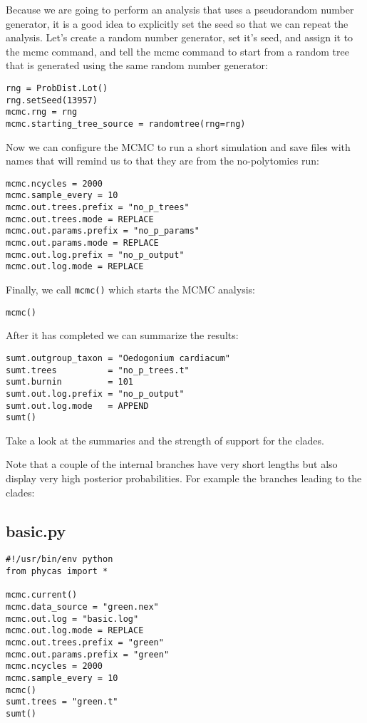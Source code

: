 \documentclass{article}
\newcommand{\cmd}[1]{\texttt{#1}\xspace}
\begin{document}
Because we are going to perform an analysis that uses a pseudorandom number generator, it is a 
good idea to explicitly set the seed so that we can repeat the analysis.
Let's create a random number generator, set it's seed, and assign it to the mcmc command, and 
tell the mcmc command to start from a random tree that is generated using the same random
number generator:

\begin{verbatim}
rng = ProbDist.Lot()
rng.setSeed(13957)
mcmc.rng = rng
mcmc.starting_tree_source = randomtree(rng=rng)
\end{verbatim}

Now we can configure the MCMC to run a short simulation and save files with names that
will remind us to that they are from the no-polytomies run:
\begin{verbatim}
mcmc.ncycles = 2000
mcmc.sample_every = 10
mcmc.out.trees.prefix = "no_p_trees"
mcmc.out.trees.mode = REPLACE
mcmc.out.params.prefix = "no_p_params"
mcmc.out.params.mode = REPLACE
mcmc.out.log.prefix = "no_p_output"
mcmc.out.log.mode = REPLACE
\end{verbatim}

Finally, we call \cmd{mcmc()} which starts the MCMC analysis:
\begin{verbatim}
mcmc()
\end{verbatim}

After it has completed we can summarize the results:

\begin{verbatim}
sumt.outgroup_taxon = "Oedogonium cardiacum"
sumt.trees          = "no_p_trees.t"
sumt.burnin         = 101
sumt.out.log.prefix = "no_p_output"
sumt.out.log.mode   = APPEND
sumt()
\end{verbatim}
Take a look at the summaries and  the strength of support for the clades.

Note that a couple of the internal branches have very short lengths but 
also display very high posterior probabilities.  
For example the branches leading to the clades:
\newpage
\subsection{basic.py}\label{basicpy}
\begin{verbatim}
#!/usr/bin/env python
from phycas import *

mcmc.current()
mcmc.data_source = "green.nex"
mcmc.out.log = "basic.log"
mcmc.out.log.mode = REPLACE
mcmc.out.trees.prefix = "green"
mcmc.out.params.prefix = "green"
mcmc.ncycles = 2000
mcmc.sample_every = 10
mcmc()
sumt.trees = "green.t"
sumt()
\end{verbatim}
\end{document}
